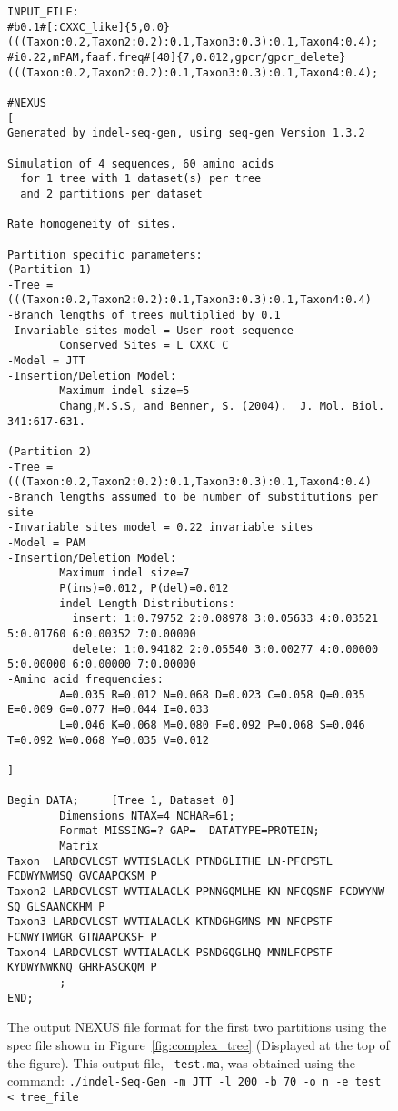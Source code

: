 \documentclass[10pt]{article}
\begin{document}
\begin{figure}
\footnotesize{
\begin{verbatim}
INPUT_FILE:
#b0.1#[:CXXC_like]{5,0.0}(((Taxon:0.2,Taxon2:0.2):0.1,Taxon3:0.3):0.1,Taxon4:0.4);
#i0.22,mPAM,faaf.freq#[40]{7,0.012,gpcr/gpcr_delete}(((Taxon:0.2,Taxon2:0.2):0.1,Taxon3:0.3):0.1,Taxon4:0.4);

#NEXUS
[
Generated by indel-seq-gen, using seq-gen Version 1.3.2
 
Simulation of 4 sequences, 60 amino acids
  for 1 tree with 1 dataset(s) per tree
  and 2 partitions per dataset
 
Rate homogeneity of sites.
 
Partition specific parameters:
(Partition 1)
-Tree = (((Taxon:0.2,Taxon2:0.2):0.1,Taxon3:0.3):0.1,Taxon4:0.4)
-Branch lengths of trees multiplied by 0.1
-Invariable sites model = User root sequence
        Conserved Sites = L CXXC C
-Model = JTT
-Insertion/Deletion Model:
        Maximum indel size=5
        Chang,M.S.S, and Benner, S. (2004).  J. Mol. Biol. 341:617-631.
 
(Partition 2)
-Tree = (((Taxon:0.2,Taxon2:0.2):0.1,Taxon3:0.3):0.1,Taxon4:0.4)
-Branch lengths assumed to be number of substitutions per site
-Invariable sites model = 0.22 invariable sites
-Model = PAM
-Insertion/Deletion Model:
        Maximum indel size=7
        P(ins)=0.012, P(del)=0.012
        indel Length Distributions:
          insert: 1:0.79752 2:0.08978 3:0.05633 4:0.03521 5:0.01760 6:0.00352 7:0.00000
          delete: 1:0.94182 2:0.05540 3:0.00277 4:0.00000 5:0.00000 6:0.00000 7:0.00000
-Amino acid frequencies:
        A=0.035 R=0.012 N=0.068 D=0.023 C=0.058 Q=0.035 E=0.009 G=0.077 H=0.044 I=0.033
        L=0.046 K=0.068 M=0.080 F=0.092 P=0.068 S=0.046 T=0.092 W=0.068 Y=0.035 V=0.012
 
]
 
Begin DATA;     [Tree 1, Dataset 0]
        Dimensions NTAX=4 NCHAR=61;
        Format MISSING=? GAP=- DATATYPE=PROTEIN;
        Matrix
Taxon  LARDCVLCST WVTISLACLK PTNDGLITHE LN-PFCPSTL FCDWYNWMSQ GVCAAPCKSM P
Taxon2 LARDCVLCST WVTIALACLK PPNNGQMLHE KN-NFCQSNF FCDWYNW-SQ GLSAANCKHM P
Taxon3 LARDCVLCST WVTIALACLK KTNDGHGMNS MN-NFCPSTF FCNWYTWMGR GTNAAPCKSF P
Taxon4 LARDCVLCST WVTIALACLK PSNDGQGLHQ MNNLFCPSTF KYDWYNWKNQ GHRFASCKQM P
        ; 
END; 
\end{verbatim}
}
\caption{The output NEXUS file format for the first two partitions using the spec file shown 
in Figure~\ref{fig:complex_tree} (Displayed at the top of the figure).  This output file, {\tt 
test.ma}, was obtained using the command:
{\tt ./indel-Seq-Gen -m JTT -l 200 -b 70 -o n -e test < tree\_file}}
\label{fig:NEX}
\end{figure}
\end{document}
